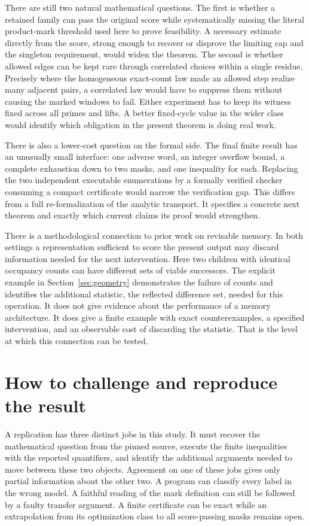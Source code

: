 \documentclass[12pt,letterpaper]{article}
\begin{document}
There are still two natural mathematical questions. The first is whether a retained family can pass the original score while systematically missing the literal product-mark threshold used here to prove feasibility. A necessary estimate directly from the score, strong enough to recover or disprove the limiting cap and the singleton requirement, would widen the theorem. The second is whether allowed edges can be kept rare through correlated choices within a single residue. Precisely where the homogeneous exact-count law made an allowed step realize many adjacent pairs, a correlated law would have to suppress them without causing the marked windows to fail. Either experiment has to keep its witness fixed across all primes and lifts. A better fixed-cycle value in the wider class would identify which obligation in the present theorem is doing real work.

There is also a lower-cost question on the formal side. The final finite result has an unusually small interface: one adverse word, an integer overflow bound, a complete exhaustion down to two masks, and one inequality for each. Replacing the two independent executable enumerations by a formally verified checker consuming a compact certificate would narrow the verification gap. This differs from a full re-formalization of the analytic transport. It specifies a concrete next theorem and exactly which current claims its proof would strengthen.

There is a methodological connection to prior work on revisable memory. In both settings a representation sufficient to score the present output may discard information needed for the next intervention. Here two children with identical occupancy counts can have different sets of viable successors. The explicit example in Section~\ref{sec:geometry} demonstrates the failure of counts and identifies the additional statistic, the reflected difference set, needed for this operation. It does not give evidence about the performance of a memory architecture. It does give a finite example with exact counterexamples, a specified intervention, and an observable cost of discarding the statistic. That is the level at which this connection can be tested.
\appendix
\section{How to challenge and reproduce the result}
\label{sec:experiment-audit}

A replication has three distinct jobs in this study. It must recover the mathematical question from the pinned source, execute the finite inequalities with the reported quantifiers, and identify the additional arguments needed to move between these two objects. Agreement on one of these jobs gives only partial information about the other two. A program can classify every label in the wrong model. A faithful reading of the mark definition can still be followed by a faulty transfer argument. A finite certificate can be exact while an extrapolation from its optimization class to all score-passing masks remains open.
\end{document}
